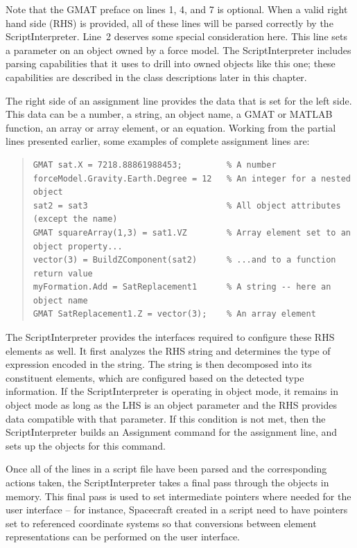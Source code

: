 \noindent Note that the GMAT preface on lines 1, 4, and 7 is optional.  When a valid right hand side
(RHS) is provided, all of these lines will be parsed correctly by the ScriptInterpreter.  Line~2
deserves some special consideration here.  This line sets a parameter on an object owned by a force
model.  The ScriptInterpreter includes parsing capabilities that it uses to drill into owned
objects like this one; these capabilities are described in the class descriptions later in this
chapter.

The right side of an assignment line provides the data that is set for the left side.  This data
can be a number, a string, an object name, a GMAT or MATLAB function, an array or array element,
or an equation.  Working from the partial lines presented earlier, some examples of complete
assignment lines are:

\begin{quote}
\linenumbers[1]
\begin{verbatim}
GMAT sat.X = 7218.88861988453;         % A number
forceModel.Gravity.Earth.Degree = 12   % An integer for a nested object
sat2 = sat3                            % All object attributes (except the name)
GMAT squareArray(1,3) = sat1.VZ        % Array element set to an object property...
vector(3) = BuildZComponent(sat2)      % ...and to a function return value
myFormation.Add = SatReplacement1      % A string -- here an object name
GMAT SatReplacement1.Z = vector(3);    % An array element
\end{verbatim}
\nolinenumbers
\end{quote}

The ScriptInterpreter provides the interfaces required to configure these RHS elements as well.  It
first analyzes the RHS string and determines the type of expression encoded in the string.  The
string is then decomposed into its constituent elements, which are configured based on the detected
type information.  If the ScriptInterpreter is operating in object mode, it remains in object mode
as long as the LHS is an object parameter and the RHS provides data compatible with that parameter.
 If this condition is not met, then the ScriptInterpreter builds an Assignment command for the
assignment line, and sets up the objects for this command.

Once all of the lines in a script file have been parsed and the corresponding actions taken, the
ScriptInterpreter takes a final pass through the objects in memory.  This final pass is used to set
intermediate pointers where needed for the user interface -- for instance, Spacecraft created in a
script need to have pointers set to referenced coordinate systems so that conversions between
element representations can be performed on the user interface.

